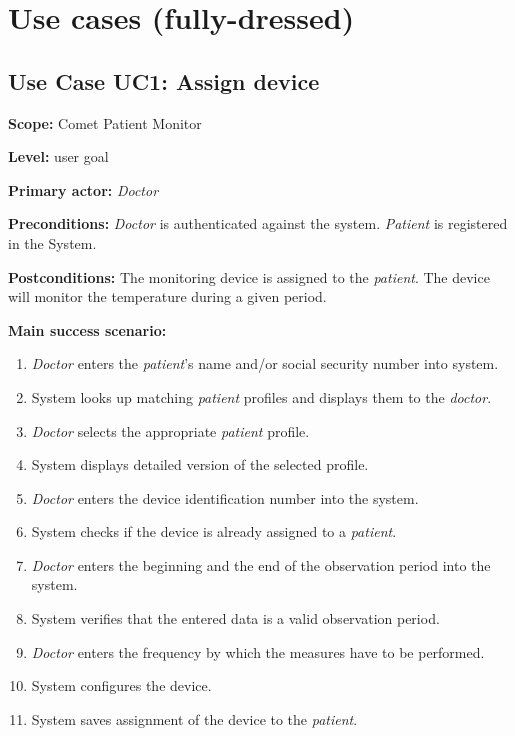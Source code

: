 \documentclass[fontsize=12pt,
               paper=a4,
               twoside=false,
               parskip=half,
               ]{scrartcl}
\begin{document}

\section{Use cases (fully-dressed)}


\subsection{Use Case UC1: Assign device}

\textbf{\textsf{Scope:}} Comet Patient Monitor

\textbf{\textsf{Level:}} user goal

\textbf{\textsf{Primary actor:}} \emph{Doctor}

\textbf{\textsf{Preconditions:}} \emph{Doctor} is authenticated against the system. \emph{Patient} is registered in the System.

\textbf{\textsf{Postconditions:}} The monitoring device is assigned to the \emph{patient}. The device will monitor the temperature during a given period.

\textbf{\textsf{Main success scenario:}}

\begin{enumerate}[leftmargin=3em]
	\item \emph{Doctor} enters the \emph{patient}'s name and/or social security number into system.
	\item System looks up matching \emph{patient} profiles and displays them to the \emph{doctor}.
	\item \emph{Doctor} selects the appropriate \emph{patient} profile.
	\item System displays detailed version of the selected profile.
	\item \emph{Doctor} enters the device identification number into the system.
	\item System checks if the device is already assigned to a \emph{patient}.
	\item \emph{Doctor} enters the beginning and the end of the observation period into the system.
	\item System verifies that the entered data is a valid observation period.
	\item \emph{Doctor} enters the frequency by which the measures have to be performed.
	\item System configures the device.
	\item System saves assignment of the device to the \emph{patient}.
\end{enumerate}
\end{document}
